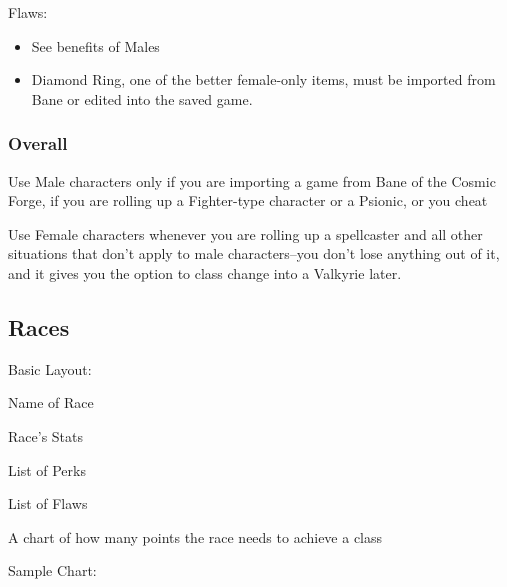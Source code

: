 \documentclass[12pt]{article}
\begin{document}
Flaws:

\begin{itemize}
\item
  See benefits of Males
\item
  Diamond Ring, one of the better female-only items, must be imported
  from Bane or edited into the saved game.
\end{itemize}

\subsubsection{Overall}\label{overall}

Use Male characters only if you are importing a game from Bane of the
Cosmic Forge, if you are rolling up a Fighter-type character or a
Psionic, or you cheat

Use Female characters whenever you are rolling up a spellcaster and all
other situations that don't apply to male characters--you don't lose
anything out of it, and it gives you the option to class change into a
Valkyrie later.

\subsection{Races}\label{races}

Basic Layout:

Name of Race

Race's Stats

List of Perks

List of Flaws

A chart of how many points the race needs to achieve a class

Sample Chart:
\end{document}

